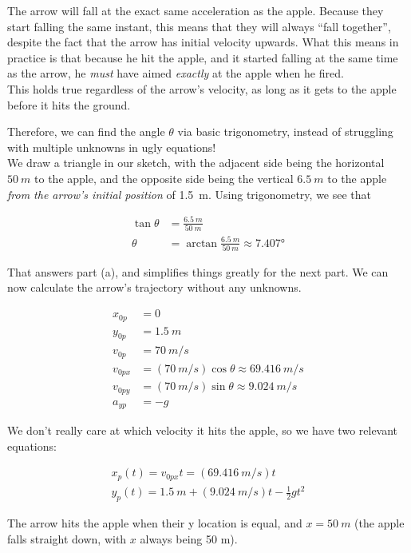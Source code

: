 \documentclass[8.01x]{subfiles}
\begin{document}
The arrow will fall at the exact same acceleration as the apple. Because they start falling the same instant, this means that they will always ``fall together'', despite the fact that the arrow has initial velocity upwards. What this means in practice is that because he hit the apple, and it started falling at the same time as the arrow, he \emph{must} have aimed \emph{exactly} at the apple when he fired.\\
This holds true regardless of the arrow's velocity, as long as it gets to the apple before it hits the ground.

Therefore, we can find the angle $\theta$ via basic trigonometry, instead of struggling with multiple unknowns in ugly equations!\\
We draw a triangle in our sketch, with the adjacent side being the horizontal $\SI{50}{m}$ to the apple, and the opposite side being the vertical $\SI{6.5}{m}$ to the apple \emph{from the arrow's initial position} of \SI{1.5}{m}. Using trigonometry, we see that

\begin{align}
\tan \theta &= \frac{\SI{6.5}{m}}{\SI{50}{m}}\\
\theta &= \arctan \frac{\SI{6.5}{m}}{\SI{50}{m}} \approx \ang{7.407}
\end{align}

That answers part (a), and simplifies things greatly for the next part. We can now calculate the arrow's trajectory without any unknowns.

\begin{align}
x_{0p} &= 0\\
y_{0p} &= \SI{1.5}{m}\\
v_{0p} &= \SI{70}{m/s}\\
v_{0px} &= (\SI{70}{m/s}) \cos \theta \approx \SI{69.416}{m/s}\\
v_{0py} &= (\SI{70}{m/s}) \sin \theta \approx \SI{9.024}{m/s}\\
a_{yp} &= -g
\end{align}

We don't really care at which velocity it hits the apple, so we have two relevant equations:

\begin{align}
x_p(t) = v_{0px} t = (\SI{69.416}{m/s}) t\\
y_p(t) = \SI{1.5}{m} + (\SI{9.024}{m/s}) t - \frac{1}{2} g t^2
\end{align}

The arrow hits the apple when their y location is equal, and $x = \SI{50}{m}$ (the apple falls straight down, with $x$ always being 50 m).
\end{document}
